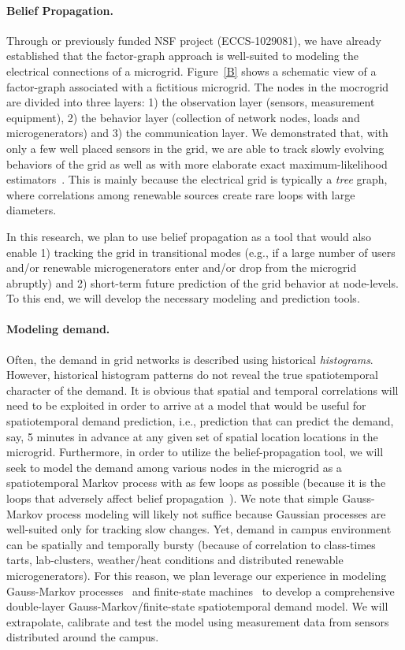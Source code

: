 \paragraph{Belief Propagation.} Through or previously funded NSF project
(ECCS-1029081), we have already established that the factor-graph approach
is well-suited to modeling the electrical connections of a microgrid.
Figure~\ref{B} shows a schematic view of a factor-graph associated with a
fictitious microgrid. The nodes in the mocrogrid are divided into three
layers: 1) the observation layer (sensors, measurement equipment), 2) the
behavior layer (collection of network nodes, loads and microgenerators) and
3) the communication layer. We demonstrated that, with only a few well
placed sensors in the grid, we are able to track slowly evolving behaviors
of the grid as well as with more elaborate exact maximum-likelihood
estimators~\cite{Hu10,Hu11,Hu11a}. This is mainly because the electrical
grid is typically a {\em tree} graph, where correlations among renewable
sources create rare loops with large diameters.

In this research, we plan to use belief propagation as a tool that would
also enable 1) tracking the grid in transitional modes (e.g., if a large
number of users and/or renewable microgenerators enter and/or drop from the
microgrid abruptly) and 2) short-term future prediction of the grid
behavior at node-levels.  To this end, we will develop the necessary
modeling and prediction tools.

\paragraph{Modeling demand.} Often, the demand in grid networks is
described using historical {\em histograms}. However, historical histogram
patterns do not reveal the true spatiotemporal character of the demand. It
is obvious that spatial and temporal correlations will need to be exploited
in order to arrive at a model that would be useful for spatiotemporal
demand prediction, i.e., prediction that can predict the demand, say, 5
minutes in advance at any given set of spatial location locations in the
microgrid.  Furthermore, in order to utilize the belief-propagation tool,
we will seek to model the demand among various nodes in the microgrid as a
spatiotemporal Markov process with as few loops as possible (because it is
the loops that adversely affect belief
propagation~\cite{Wiberg95,Kschischang01,Loeliger07}). We note that simple
Gauss-Markov process modeling will likely not suffice because Gaussian
processes are well-suited only for tracking slow changes.  Yet, demand in
campus environment can be spatially and temporally bursty (because of
correlation to class-times tarts, lab-clusters, weather/heat conditions and
distributed renewable microgenerators).  For this reason, we plan leverage
our experience in modeling Gauss-Markov processes~\cite{Kavcic00a} and
finite-state machines~\cite{Yang05,Vontobel08} to develop a comprehensive
double-layer Gauss-Markov/finite-state spatiotemporal demand model.  We
will extrapolate, calibrate and test the model using measurement data from
sensors distributed around the campus.

